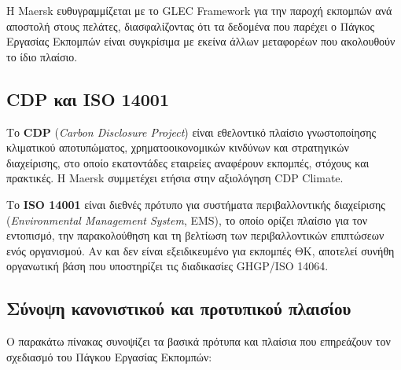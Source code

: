 Η Maersk ευθυγραμμίζεται με το GLEC Framework για την παροχή εκπομπών
ανά αποστολή στους πελάτες, διασφαλίζοντας ότι τα δεδομένα που παρέχει ο
Πάγκος Εργασίας Εκπομπών είναι συγκρίσιμα με εκείνα άλλων μεταφορέων που
ακολουθούν το ίδιο πλαίσιο.

\subsection{CDP και ISO 14001}\label{cdp-ux3baux3b1ux3b9-iso-14001}

Το \textbf{CDP} (\emph{Carbon Disclosure Project}) είναι εθελοντικό
πλαίσιο γνωστοποίησης κλιματικού αποτυπώματος, χρηματοοικονομικών
κινδύνων και στρατηγικών διαχείρισης, στο οποίο εκατοντάδες εταιρείες
αναφέρουν εκπομπές, στόχους και πρακτικές. Η Maersk συμμετέχει ετήσια
στην αξιολόγηση CDP Climate.

Το \textbf{ISO 14001} είναι διεθνές πρότυπο για συστήματα
περιβαλλοντικής διαχείρισης (\emph{Environmental Management System},
EMS), το οποίο ορίζει πλαίσιο για τον εντοπισμό, την παρακολούθηση και
τη βελτίωση των περιβαλλοντικών επιπτώσεων ενός οργανισμού. Αν και δεν
είναι εξειδικευμένο για εκπομπές ΘΚ, αποτελεί συνήθη οργανωτική βάση που
υποστηρίζει τις διαδικασίες GHGP/ISO 14064.

\subsection{Σύνοψη κανονιστικού και προτυπικού
πλαισίου}\label{ux3c3ux3cdux3bdux3bfux3c8ux3b7-ux3baux3b1ux3bdux3bfux3bdux3b9ux3c3ux3c4ux3b9ux3baux3bfux3cd-ux3baux3b1ux3b9-ux3c0ux3c1ux3bfux3c4ux3c5ux3c0ux3b9ux3baux3bfux3cd-ux3c0ux3bbux3b1ux3b9ux3c3ux3afux3bfux3c5}

Ο παρακάτω πίνακας συνοψίζει τα βασικά πρότυπα και πλαίσια που
επηρεάζουν τον σχεδιασμό του Πάγκου Εργασίας Εκπομπών:


